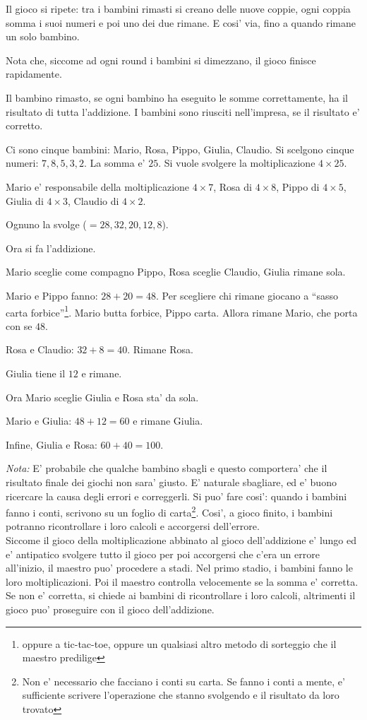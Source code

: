 \documentclass[a4paper]{article}
\begin{document}
Il gioco si ripete: tra i bambini rimasti si creano delle nuove coppie, ogni coppia somma i suoi numeri e poi uno dei due rimane.
E cosi' via, fino a quando rimane un solo bambino.

Nota che, siccome ad ogni round i bambini si dimezzano, il gioco finisce rapidamente.

Il bambino rimasto, se ogni bambino ha eseguito le somme correttamente, ha il risultato di tutta l'addizione. I bambini sono riusciti nell'impresa, se il risultato e' corretto.

\begin{exemp}
Ci sono cinque bambini: Mario, Rosa, Pippo, Giulia, Claudio. Si scelgono cinque numeri: $7,8,5,3,2$. La somma e' $25$. Si vuole svolgere la moltiplicazione $4\times 25$.

Mario e' responsabile della moltiplicazione $4\times 7$, Rosa di $4\times 8$, Pippo di $4\times 5$, Giulia di $4\times 3$, Claudio di $4\times 2$.

Ognuno la svolge ($=28, 32,20,12,8$).

Ora si fa l'addizione.

Mario sceglie come compagno Pippo, Rosa sceglie Claudio, Giulia rimane sola.

Mario e Pippo fanno: $28+20=48$. Per scegliere chi rimane giocano a ``sasso carta forbice''\footnote{oppure a tic-tac-toe, oppure un qualsiasi altro metodo di sorteggio che il maestro predilige}. Mario butta forbice, Pippo carta. Allora rimane Mario, che porta con se $48$.

Rosa e Claudio: $32+8=40$. Rimane Rosa.

Giulia tiene il $12$ e rimane.

Ora Mario sceglie Giulia e Rosa sta' da sola.

Mario e Giulia: $48+12=60$ e rimane Giulia.

Infine, Giulia e Rosa: $60+40=100$.

\end{exemp}


\emph{Nota:} E' probabile che qualche bambino sbagli e questo comportera' che il risultato finale dei giochi non sara' giusto. E' naturale sbagliare, ed e' buono ricercare la causa degli errori e correggerli. Si puo' fare cosi': quando i bambini fanno i conti, scrivono su un foglio di carta\footnote{Non e' necessario che facciano i conti su carta. Se fanno i conti a mente, e' sufficiente scrivere l'operazione che stanno svolgendo e il risultato da loro trovato}. Cosi', a gioco finito, i bambini potranno ricontrollare i loro calcoli e accorgersi dell'errore.\\
Siccome il gioco della moltiplicazione abbinato al gioco dell'addizione e' lungo ed e' antipatico svolgere tutto il gioco per poi accorgersi che c'era un errore all'inizio, il maestro puo' procedere a stadi. Nel primo stadio, i bambini fanno le loro moltiplicazioni. Poi il maestro controlla velocemente se la somma e' corretta. Se non e' corretta, si chiede ai bambini di ricontrollare i loro calcoli, altrimenti il gioco puo' proseguire con il gioco dell'addizione.
\end{document}
